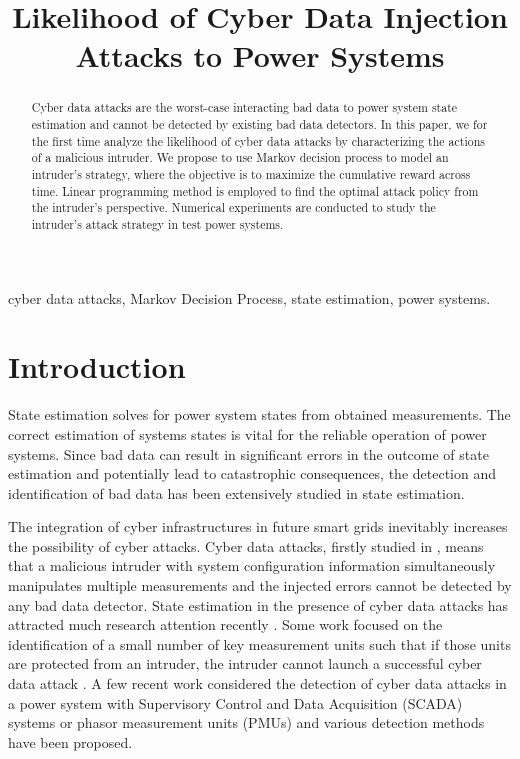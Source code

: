 \documentclass[conference,letterpaper,10pt]{IEEEtran}
\title{Likelihood of Cyber Data Injection Attacks to Power Systems}
\author{
\IEEEauthorblockN{Yingshuai Hao, \textit{Student Member, IEEE,}  Meng Wang, \textit{Member, IEEE}, Joe Chow, \textit{Fellow, IEEE} 
\IEEEauthorblockA{Department of Electrical, Computer, and Systems Engineering\\
Rensselaer Polytechnic Institute, Troy, NY, 12180, USA\\
Email:   \{haoy2,wangm7,chowj\}@rpi.edu}
 }
}
\begin{document}
\maketitle \thispagestyle{empty} \pagestyle{empty}

\begin{abstract}
Cyber data attacks are the worst-case interacting bad data to power system state estimation and cannot be detected by existing bad data detectors.
In this paper, we for the first time analyze the likelihood of cyber data attacks by characterizing  the actions of a malicious intruder. 
We propose to use Markov decision process to model an intruder's strategy, where the objective is to maximize the cumulative reward across time. Linear programming method is employed to find the  optimal attack policy from the intruder's perspective.   Numerical experiments are conducted to  study the intruder's attack strategy in test power systems. 
\end{abstract}
\begin{IEEEkeywords}
cyber data attacks, Markov Decision Process, state estimation, power systems.
\end{IEEEkeywords}

\section{Introduction}\label{sec:intro} 
 
State  estimation \cite{AE04} solves for power system states from obtained measurements. The correct estimation of systems states is vital for the reliable operation of  power systems.  
Since  bad data 
can result in significant errors in  the outcome of state estimation and potentially lead to catastrophic consequences,   the detection and identification of bad data has been extensively studied \cite{CA06,HSKF75,MG83,MS71,XWCT13} in state estimation. 
  
The integration of cyber infrastructures in future smart grids inevitably increases the possibility of cyber attacks. 
Cyber data attacks, firstly studied in \cite{LNR11}, 
means that a malicious intruder with system configuration information simultaneously manipulates   multiple  measurements and the injected errors cannot be detected by any bad data detector. 
State estimation in the presence of cyber data  attacks has attracted much research attention recently  \cite{BRWKNO10,DS10,KJTT10,LEDEH14,LNR11,SJ13,STJ10,TKPC11}. Some work focused on the identification 
of a small number of key measurement units 
such that if those units are protected from an intruder, the intruder cannot launch a successful cyber data attack \cite{BRWKNO10,DS10,KP11}.
A few recent work \cite{SJ13,LEDEH14,WGGCFSR14} considered the detection of cyber data attacks in a power system with Supervisory Control and Data Acquisition (SCADA) systems or phasor measurement units (PMUs) and various detection methods have been proposed. 
\end{document}
